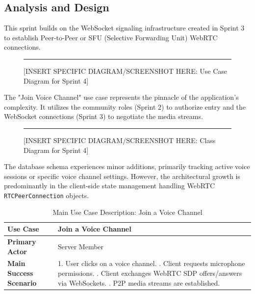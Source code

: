 \subsection{Analysis and Design}
This sprint builds on the WebSocket signaling infrastructure created in Sprint 3 to establish Peer-to-Peer or SFU (Selective Forwarding Unit) WebRTC connections.

\begin{figure}[h!]
    \centering
    \rule{0.8\textwidth}{5cm} %
    \caption{[INSERT SPECIFIC DIAGRAM/SCREENSHOT HERE: Use Case Diagram for Sprint 4]}
    \label{fig:sprint4_usecase}
\end{figure}

The "Join Voice Channel" use case represents the pinnacle of the application's complexity. It utilizes the community roles (Sprint 2) to authorize entry and the WebSocket connections (Sprint 3) to negotiate the media streams.

\begin{figure}[h!]
    \centering
    \rule{0.8\textwidth}{5cm} %
    \caption{[INSERT SPECIFIC DIAGRAM/SCREENSHOT HERE: Class Diagram for Sprint 4]}
    \label{fig:sprint4_class}
\end{figure}

The database schema experiences minor additions, primarily tracking active voice sessions or specific voice channel settings. However, the architectural growth is predominantly in the client-side state management handling WebRTC \texttt{RTCPeerConnection} objects.

\begin{table}[h!]
    \centering
    \begin{tabular}{|p{4cm}|p{10cm}|}
        \hline
        \textbf{Use Case} & \textbf{Join a Voice Channel} \\
        \hline
        \textbf{Primary Actor} & Server Member \\
        \hline
        \textbf{Main Success Scenario} & 1. User clicks on a voice channel. \newline 2. Client requests microphone permissions. \newline 3. Client exchanges WebRTC SDP offers/answers via WebSockets. \newline 4. P2P media streams are established. \\
        \hline
    \end{tabular}
    \caption{Main Use Case Description: Join a Voice Channel}
    \label{tab:sprint4_uc_desc}
\end{table}

